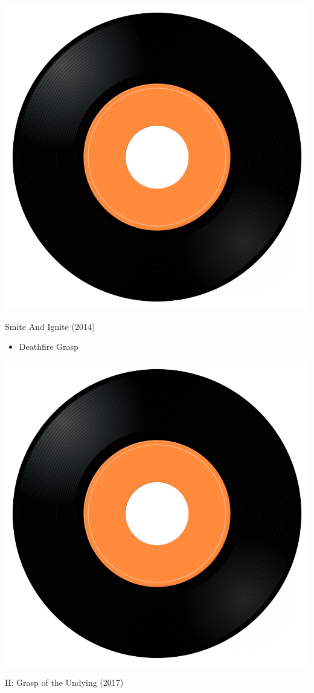 \begin{minipage}[t]{0.25\textwidth}
\captionsetup{type=figure}
\includegraphics[width=\textwidth]{Images/cover.png}
\caption*{Smite And Ignite (2014)}
\end{minipage}
\begin{minipage}[t]{0.25\textwidth}\vspace{0pt}
\begin{itemize}[nosep,leftmargin=1em,labelwidth=*,align=left]
	\setlength{\itemsep}{0pt}
	\item Deathfire Grasp
\end{itemize}
\end{minipage}
\begin{minipage}[t]{0.25\textwidth}
\captionsetup{type=figure}
\includegraphics[width=\textwidth]{Images/cover.png}
\caption*{II: Grasp of the Undying (2017)}
\end{minipage}
